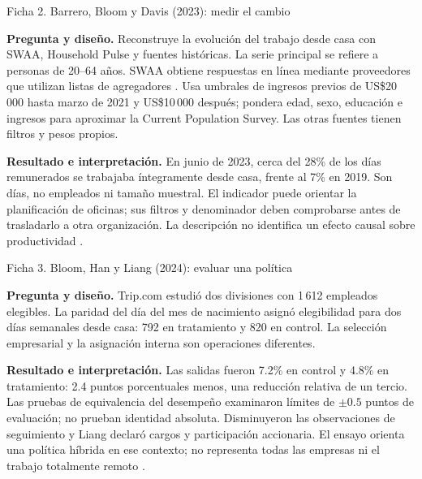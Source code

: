 \begin{fichainvestigacion}{Ficha 2. Barrero, Bloom y Davis (2023): medir el cambio}

\textbf{Pregunta y diseño.} Reconstruye la evolución del trabajo desde casa con SWAA, Household Pulse y fuentes históricas. La serie principal se refiere a personas de 20--64 años. SWAA obtiene respuestas en línea mediante proveedores que utilizan listas de agregadores \citep[diap.~3]{wfhMetodos2023}. Usa umbrales de ingresos previos de US\$20\,000 hasta marzo de 2021 y US\$10\,000 después; pondera edad, sexo, educación e ingresos para aproximar la Current Population Survey. Las otras fuentes tienen filtros y pesos propios.

\textbf{Resultado e interpretación.} En junio de 2023, cerca del 28\% de los días remunerados se trabajaba íntegramente desde casa, frente al 7\% en 2019. Son días, no empleados ni tamaño muestral. El indicador puede orientar la planificación de oficinas; sus filtros y denominador deben comprobarse antes de trasladarlo a otra organización. La descripción no identifica un efecto causal sobre productividad \citep{barrero2023}.
\end{fichainvestigacion}

\begin{fichainvestigacion}{Ficha 3. Bloom, Han y Liang (2024): evaluar una política}

\textbf{Pregunta y diseño.} Trip.com estudió dos divisiones con 1\,612 empleados elegibles. La paridad del día del mes de nacimiento asignó elegibilidad para dos días semanales desde casa: 792 en tratamiento y 820 en control. La selección empresarial y la asignación interna son operaciones diferentes.

\textbf{Resultado e interpretación.} Las salidas fueron 7.2\% en control y 4.8\% en tratamiento: 2.4 puntos porcentuales menos, una reducción relativa de un tercio. Las pruebas de equivalencia del desempeño examinaron límites de $\pm0.5$ puntos de evaluación; no prueban identidad absoluta. Disminuyeron las observaciones de seguimiento y Liang declaró cargos y participación accionaria. El ensayo orienta una política híbrida en ese contexto; no representa todas las empresas ni el trabajo totalmente remoto \citep{bloom2024}.
\end{fichainvestigacion}

